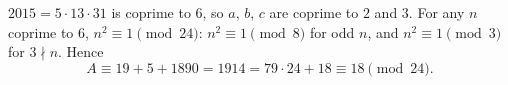 $2015=5\cdot13\cdot31$ is coprime to $6$, so $a$, $b$, $c$ are coprime to $2$ and $3$. For any $n$ coprime to $6$, $n^2\equiv1\pmod{24}$: $n^2\equiv1\pmod8$ for odd $n$, and $n^2\equiv1\pmod3$ for $3\nmid n$. Hence
\[
A\equiv19+5+1890=1914=79\cdot24+18\equiv\boxed{18}\pmod{24}.
\]
